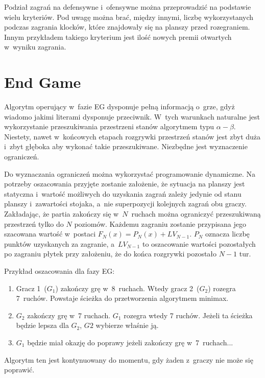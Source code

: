 \documentclass[a4paper,twocolumn,12pt]{article}
\theoremstyle{definition}
\begin{document}
Podział zagrań na defensywne i~ofensywne można przeprowadzić na podstawie wielu kryteriów. Pod uwagę można brać, między innymi, liczbę wykorzystanych podczas zagrania klocków, które znajdowały się na planszy przed rozegraniem. Innym przykładem takiego kryterium jest ilość nowych premii otwartych w~wyniku zagrania.

\section*{End Game}

Algorytm operujący w~fazie EG dysponuje pełną informacją o~grze, gdyż wiadomo jakimi literami dysponuje przeciwnik. W~tych warunkach naturalne jest wykorzystanie przeszukiwania przestrzeni stanów algorytmem typu $\alpha - \beta$. Niestety, nawet w~końcowych etapach rozgrywki przestrzeń stanów jest zbyt duża i~zbyt głęboka aby wykonać takie przeszukiwane. Niezbędne jest wyznaczenie ograniczeń.

Do wyznaczania ograniczeń można wykorzystać programowanie dynamiczne. Na potrzeby oszacowania przyjęte zostanie założenie, że sytuacja na planszy jest statyczna i~wartość możliwych do uzyskania zagrań zależy jedynie od stanu planszy i~zawartości stojaka, a~nie superpozycji kolejnych zagrań obu graczy. Zakładając, że partia zakończy się w~$N$~ruchach można ograniczyć przeszukiwaną przestrzeń tylko do $N$ poziomów. Każdemu zagraniu zostanie przypisana jego szacowana wartość w~postaci $F_{N}(x) = P_{N}(x) + LV_{N-1}$. $P_{N}$ oznacza liczbę punktów uzyskanych za zagranie, a~$LV_{N-1}$ to oszacowanie wartości pozostałych po zagraniu płytek przy założeniu, że do końca rozgrywki pozostało $N - 1$ tur.

Przykład oszacowania dla fazy EG:

\begin{enumerate}
	\item Gracz 1~($G_{1}$) zakończy grę w~8~ruchach. Wtedy gracz 2~($G_{2}$) rozegra 7~ruchów. Powstaje ścieżka do przetworzenia algorytmem minimax.
	\item $G_{2}$ zakończy grę w~7 ruchach. $G_{1}$ rozegra wtedy 7 ruchów. Jeżeli ta ścieżka będzie lepsza dla $G_{2}$, $G{2}$ wybierze właśnie ją.
	\item $G_{1}$ będzie miał okazję do poprawy jeżeli zakończy grę w~7~ruchach...
\end{enumerate}

Algorytm ten jest kontynuowany do momentu, gdy żaden z~graczy nie może się poprawić.
\end{document}

